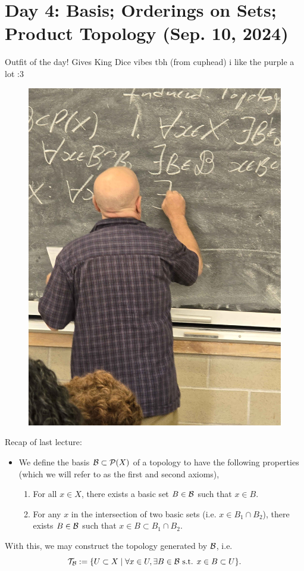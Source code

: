 \section{Day 4: Basis; Orderings on Sets; Product Topology (Sep. 10, 2024)}
Outfit of the day! Gives King Dice vibes tbh (from cuphead) i like the purple a lot :3
\begin{figure}[h]
    \centering
    \includegraphics[scale=0.1]{MAT327 Notes/Dror Shirts/dror day 4 shirt.jpg}
\end{figure}

\noindent Recap of last lecture:
\begin{itemize}
    \item We define the basis $\mathcal B \subset \mathcal P(X)$ of a topology to have the following properties (which we will refer to as the first and second axioms),
    \begin{enumerate}
        \item For all $x \in X$, there exists a basic set $B \in \mathcal B$ such that $x \in B$.
        \item For any $x$ in the intersection of two basic sets (i.e. $x \in B_1 \cap B_2$), there exists $B \in \mathcal B$ such that $x \in B \subset B_1 \cap B_2$.
    \end{enumerate}
\end{itemize}
\noindent With this, we may construct the topology generated by $\mathcal B$, i.e.
\[ \mathcal T_\mathcal B := \{ U \subset X \mid \forall x \in U, \exists B \in \mathcal B \text{ s.t. } x \in B \subset U \}. \]

